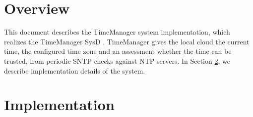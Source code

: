 \documentclass[a4paper]{arrowhead}
\begin{document}
\sloppy

\ArrowheadSetup

\begin{center}
  \vspace*{1cm}
  \huge{\arrowtitle}

  \vspace*{0.2cm}
  \LARGE{\arrowtype}
  \vspace*{1cm}

  \vspace*{\fill}


  \vspace*{1cm}
  \vspace*{\fill}

  \begin{abstract}
    This document describes the design and implementation of the TimeManager support system of Arrowhead 5.2.2 (\texttt{ah5-TimeManager-java-spring}).
  \end{abstract}

  \vspace*{1cm}
\end{center}

\newpage

\tableofcontents
\newpage

\section{Overview}
\label{sec:overview}

This document describes the TimeManager system implementation, which realizes the TimeManager SysD \cite{tim-sysd}. TimeManager gives the local cloud the current time, the configured time zone and an assessment whether the time can be trusted, from periodic SNTP checks against NTP servers.
In Section \ref{Implementation}, we describe implementation details of the system.

\newpage

\section{Implementation}
\label{Implementation}
\end{document}
